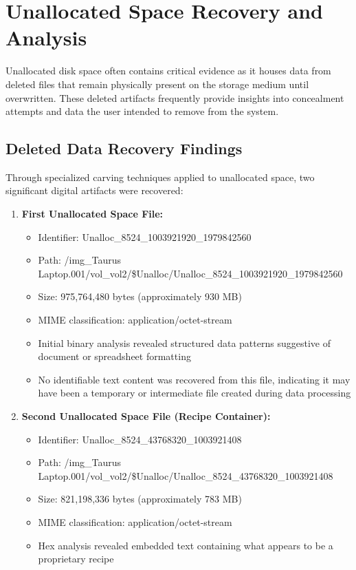 \section{Unallocated Space Recovery and Analysis}
Unallocated disk space often contains critical evidence as it houses data from deleted files that remain physically present on the storage medium until overwritten. These deleted artifacts frequently provide insights into concealment attempts and data the user intended to remove from the system.

\subsection{Deleted Data Recovery Findings}
Through specialized carving techniques applied to unallocated space, two significant digital artifacts were recovered:

\begin{enumerate}
    \item \textbf{First Unallocated Space File:}
    \begin{itemize}
        \item Identifier: Unalloc\_8524\_1003921920\_1979842560
        \item Path: /img\_Taurus Laptop.001/vol\_vol2/\$Unalloc/Unalloc\_8524\_1003921920\_1979842560
        \item Size: 975,764,480 bytes (approximately 930 MB)
        \item MIME classification: application/octet-stream
        \item Initial binary analysis revealed structured data patterns suggestive of document or spreadsheet formatting
        \item No identifiable text content was recovered from this file, indicating it may have been a temporary or intermediate file created during data processing
    \end{itemize}
    
    \item \textbf{Second Unallocated Space File (Recipe Container):}
    \begin{itemize}
        \item Identifier: Unalloc\_8524\_43768320\_1003921408
        \item Path: /img\_Taurus Laptop.001/vol\_vol2/\$Unalloc/Unalloc\_8524\_43768320\_1003921408
        \item Size: 821,198,336 bytes (approximately 783 MB)
        \item MIME classification: application/octet-stream
        \item Hex analysis revealed embedded text containing what appears to be a proprietary recipe
    \end{itemize}
\end{enumerate}

